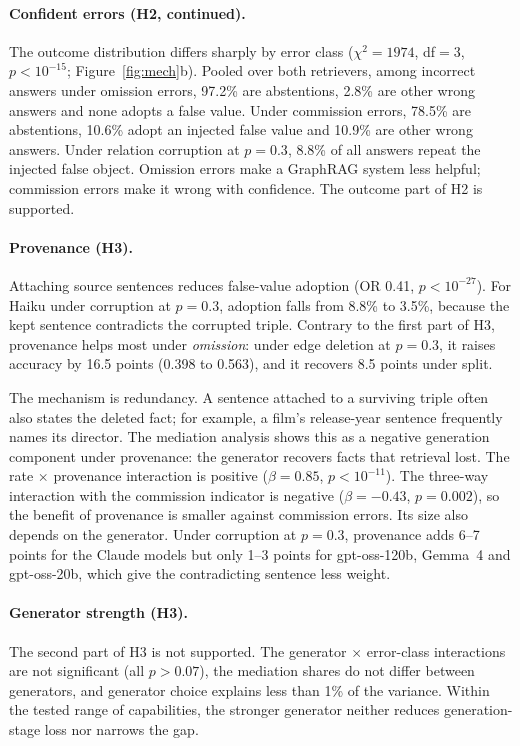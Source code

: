 \documentclass[11pt]{article}
\begin{document}
\paragraph{Confident errors (H2, continued).} The outcome distribution differs sharply by error class ($\chi^2=1974$, df$=3$, $p<10^{-15}$; Figure~\ref{fig:mech}b). Pooled over both retrievers, among incorrect answers under omission errors, 97.2\% are abstentions, 2.8\% are other wrong answers and none adopts a false value. Under commission errors, 78.5\% are abstentions, 10.6\% adopt an injected false value and 10.9\% are other wrong answers. Under relation corruption at $p=0.3$, 8.8\% of all answers repeat the injected false object. Omission errors make a GraphRAG system less helpful; commission errors make it wrong with confidence. The outcome part of H2 is supported.

\paragraph{Provenance (H3).} Attaching source sentences reduces false-value adoption (OR 0.41, $p<10^{-27}$). For Haiku under corruption at $p=0.3$, adoption falls from 8.8\% to 3.5\%, because the kept sentence contradicts the corrupted triple. Contrary to the first part of H3, provenance helps most under \emph{omission}: under edge deletion at $p=0.3$, it raises accuracy by 16.5 points (0.398 to 0.563), and it recovers 8.5 points under split.

The mechanism is redundancy. A sentence attached to a surviving triple often also states the deleted fact; for example, a film's release-year sentence frequently names its director. The mediation analysis shows this as a negative generation component under provenance: the generator recovers facts that retrieval lost. The rate $\times$ provenance interaction is positive ($\beta=0.85$, $p<10^{-11}$). The three-way interaction with the commission indicator is negative ($\beta=-0.43$, $p=0.002$), so the benefit of provenance is smaller against commission errors. Its size also depends on the generator. Under corruption at $p=0.3$, provenance adds 6--7 points for the Claude models but only 1--3 points for gpt-oss-120b, Gemma~4 and gpt-oss-20b, which give the contradicting sentence less weight.

\paragraph{Generator strength (H3).} The second part of H3 is not supported. The generator $\times$ error-class interactions are not significant (all $p>0.07$), the mediation shares do not differ between generators, and generator choice explains less than 1\% of the variance. Within the tested range of capabilities, the stronger generator neither reduces generation-stage loss nor narrows the gap.
\end{document}
